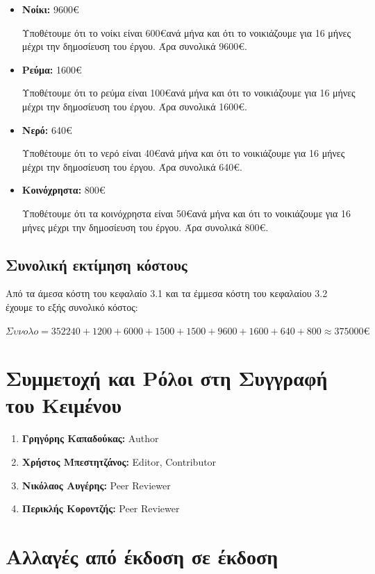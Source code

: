 \documentclass[12pt,a4paper]{article}
\begin{document}
\begin{itemize}
	\item \textbf{Νοίκι:} 9600\euro

		Υποθέτουμε ότι το νοίκι είναι 600\euro\space ανά μήνα και ότι το νοικιάζουμε για 16 μήνες μέχρι την δημοσίευση του έργου. Άρα συνολικά 9600\euro.

	\item \textbf{Ρεύμα:} 1600\euro

		Υποθέτουμε ότι το ρεύμα είναι 100\euro\space ανά μήνα και ότι το νοικιάζουμε για 16 μήνες μέχρι την δημοσίευση του έργου. Άρα συνολικά 1600\euro.

	\item \textbf{Νερό:} 640\euro

		Υποθέτουμε ότι το νερό είναι 40\euro\space ανά μήνα και ότι το νοικιάζουμε για 16 μήνες μέχρι την δημοσίευση του έργου. Άρα συνολικά 640\euro.

	\item \textbf{Κοινόχρηστα:} 800\euro

		Υποθέτουμε ότι τα κοινόχρηστα είναι 50\euro\space ανά μήνα και ότι το νοικιάζουμε για 16 μήνες μέχρι την δημοσίευση του έργου. Άρα συνολικά 800\euro.
\end{itemize}

\subsection{Συνολική εκτίμηση κόστους}

Από τα άμεσα κόστη του κεφαλαίο 3.1 και τα έμμεσα κόστη του κεφαλαίου 3.2 έχουμε το εξής συνολικό κόστος:

$Συνολο = 352240 + 1200 + 6000 + 1500 + 1500 + 9600 + 1600 + 640 + 800 \approx 375000\euro$

\section{Συμμετοχή και Ρόλοι στη Συγγραφή του Κειμένου}
\begin{enumerate}
	\item \textbf{Γρηγόρης Καπαδούκας:} Author
	\item \textbf{Χρήστος Μπεστητζάνος:} Editor, Contributor
	\item \textbf{Νικόλαος Αυγέρης:} Peer Reviewer
	\item \textbf{Περικλής Κοροντζής:} Peer Reviewer
\end{enumerate}

\section{Αλλαγές από έκδοση σε έκδοση}
\end{document}
